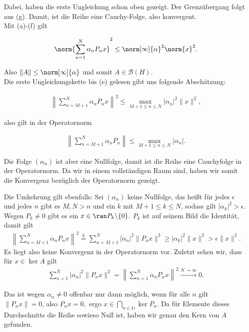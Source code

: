 \begin{solution}
Dabei, haben die erste Ungleichung schon oben gezeigt.
Der Grenzübergang folgt aus (g).
Damit, ist die Reihe eine Cauchy-Folge, also konvergent. \\

Mit (a)-(f) gilt

\begin{align*}
    \norm{\sum_{n = 1}^N \alpha_n P_n x}^2
    \leq
    \norm[\infty]{\alpha}^2 \norm{x}^2.
\end{align*}

Also $\|A\| \leq \norm[\infty]{\alpha}$ und somit $A \in \mathcal{B}(H)$. \\

Die erste Ungleichungskette bis (e) gelesen gibt uns folgende Abschätzung:

\begin{align*}
\left\| \sum_{n = M+1}^N \alpha_n P_n x \right\|^2 \leq \max_{M+1 \leq n \leq N} |\alpha_n|^2 \|x\|^2,
\end{align*}

also gilt in der Operatornorm

\begin{align*}
\left\| \sum_{n = M+1}^N \alpha_n P_n \right\| \leq \max_{M+1 \leq n \leq N} |\alpha_n|.
\end{align*}

Die Folge $(\alpha_n)$ ist aber eine Nullfolge, damit ist die Reihe eine Cauchyfolge in der Operatornorm. Da wir in einem vollständigen Raum sind, haben wir somit die Konvergenz bezüglich der Operatornorm gezeigt.

Die Umkehrung gilt ebenfalls: Sei $(\alpha_n)$ keine Nullfolge, das heißt für jedes $\epsilon$ und jedes $n$ gibt es $M, N > n$ und ein $k$ mit $M+1 \leq k \leq N$, sodass gilt $|\alpha_k|^2 > \epsilon.$ Wegen $P_k \neq 0$ gibt es ein $x \in \ran P_k\backslash\{0\}.$ $P_k$ ist auf seinem Bild die Identität, damit gilt
\begin{align}
 \left\| \sum_{n = M+1}^N \alpha_n P_n x \right\|^2 \stackrel{b}{=} \sum_{n = M+1}^N | \alpha_n|^2 \| P_n x \|^2 \geq |\alpha_k|^2 \|x\|^2 > \epsilon \|x\|^2.
\end{align}
Es liegt also keine Konvergenz in der Operatornorm vor.
Zuletzt sehen wir, dass für $x \in \ker A$ gilt
\begin{align*}
    \sum_{n=1}^N |\alpha_n|^2 \|P_n x\|^2 =
    \left\| \sum_{n = 1}^N \alpha_n P_n x \right\|^2 \stackrel{N \rightarrow \infty}{\longrightarrow} 0.
\end{align*}

Das ist wegen $\alpha_n \neq 0$ offenbar nur dann möglich, wenn für alle $n$ gilt $\|P_n x\| = 0$, also $P_n x = 0,$ ergo $x \in \bigcap_{n \in \mathbb{N}} \ker P_n$. Da für Elemente dieses Durchschnitts die Reihe sowieso Null ist, haben wir genau den Kern von $A$ gefunden.

\end{solution}
